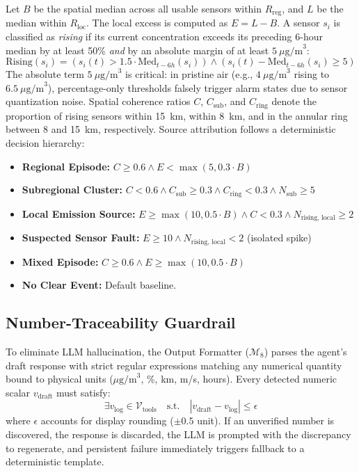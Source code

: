\documentclass[conference]{IEEEtran}
\begin{document}
Let $B$ be the spatial median across all usable sensors within $R_{\text{reg}}$, and $L$ be the median within $R_{\text{loc}}$. The local excess is computed as $E = L - B$. A sensor $s_i$ is classified as \textit{rising} if its current concentration exceeds its preceding 6-hour median by at least 50\% \textit{and} by an absolute margin of at least $5~\mu\text{g/m}^3$:
\begin{equation}
\text{Rising}(s_i) = \left( s_i(t) > 1.5 \cdot \text{Med}_{t-6h}(s_i) \right) \land \left( s_i(t) - \text{Med}_{t-6h}(s_i) \ge 5 \right)
\end{equation}
The absolute term $5~\mu\text{g/m}^3$ is critical: in pristine air (e.g., $4~\mu\text{g/m}^3$ rising to $6.5~\mu\text{g/m}^3$), percentage-only thresholds falsely trigger alarm states due to sensor quantization noise. Spatial coherence ratios $C$, $C_{\text{sub}}$, and $C_{\text{ring}}$ denote the proportion of rising sensors within 15~km, within 8~km, and in the annular ring between 8 and 15~km, respectively. Source attribution follows a deterministic decision hierarchy:
\begin{itemize}
    \item \textbf{Regional Episode:} $C \ge 0.6 \land E < \max(5, 0.3 \cdot B)$
    \item \textbf{Subregional Cluster:} $C < 0.6 \land C_{\text{sub}} \ge 0.3 \land C_{\text{ring}} < 0.3 \land N_{\text{sub}} \ge 5$
    \item \textbf{Local Emission Source:} $E \ge \max(10, 0.5 \cdot B) \land C < 0.3 \land N_{\text{rising, local}} \ge 2$
    \item \textbf{Suspected Sensor Fault:} $E \ge 10 \land N_{\text{rising, local}} < 2$ (isolated spike)
    \item \textbf{Mixed Episode:} $C \ge 0.6 \land E \ge \max(10, 0.5 \cdot B)$
    \item \textbf{No Clear Event:} Default baseline.
\end{itemize}

\subsection{Number-Traceability Guardrail}
To eliminate LLM hallucination, the Output Formatter ($\mathcal{M}_8$) parses the agent's draft response with strict regular expressions matching any numerical quantity bound to physical units ($\mu\text{g/m}^3$, \%, km, m/s, hours). Every detected numeric scalar $v_{\text{draft}}$ must satisfy:
\begin{equation}
\exists v_{\text{log}} \in \mathcal{V}_{\text{tools}} \quad \text{s.t.} \quad |v_{\text{draft}} - v_{\text{log}}| \le \epsilon
\end{equation}
where $\epsilon$ accounts for display rounding ($\pm 0.5$ unit). If an unverified number is discovered, the response is discarded, the LLM is prompted with the discrepancy to regenerate, and persistent failure immediately triggers fallback to a deterministic template.
\end{document}
